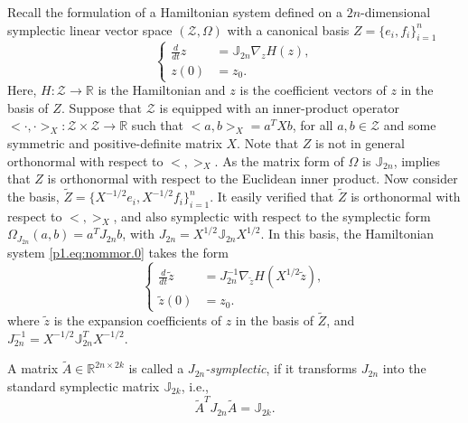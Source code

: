 Recall the formulation of a Hamiltonian system defined on a $2n$-dimensional symplectic linear vector space $(\mathcal Z,\Omega )$ with a canonical basis $Z=\{e_i,f_i\}_{i=1}^n$
\begin{equation} \label{p1.eq:nommor.0}
	\left\{
	\begin{aligned}
		\frac d {dt} z &= \mathbb J_{2n} \nabla_z H(z), \\
		z(0) &= z_0.
	\end{aligned}
	\right.
\end{equation}
Here, $H: \mathcal Z \to \mathbb R$ is the Hamiltonian and $z$ is the coefficient vectors of $z$ in the basis of $Z$. Suppose that $\mathcal Z$ is equipped with an inner-product operator $<\cdot,\cdot>_X : \mathcal Z \times \mathcal Z \to \mathbb R$ such that $<a,b>_X = a^TXb$, for all $a,b\in\mathcal Z$ and some symmetric and positive-definite matrix $X$. Note that $Z$ is not in general orthonormal with respect to $<,>_X$. As the matrix form of $\Omega$ is $\mathbb J_{2n}$,  implies that $Z$ is orthonormal with respect to the Euclidean inner product. Now consider the basis, $\tilde Z = \{ X^{-1/2}e_i,X^{-1/2}f_i \}_{i=1}^{n}$. It easily verified that $\tilde Z$ is orthonormal with respect to $<,>_{X}$, and also symplectic with respect to the symplectic form $\Omega_{J_{2n}}(a,b) = a^T J_{2n} b $, with $J_{2n} = X^{1/2} \mathbb J_{2n}X^{1/2}$. In this basis, the Hamiltonian system \eqref{p1.eq:nommor.0} takes the form
\begin{equation} \label{p1.eq:nommor.0.1}
	\left\{
	\begin{aligned}
		\frac d {dt} \tilde z &= J^{-1}_{2n} \nabla_{\tilde z} H(X^{1/2}\tilde{z}), \\
		\tilde z(0) &= z_0.
	\end{aligned}
	\right.	
\end{equation}
where $\tilde z$ is the expansion coefficients of $z$ in the basis of $\tilde Z$, and $J_{2n}^{-1} = X^{-1/2} \mathbb J_{2n}^T X^{-1/2}$. 

\begin{definition}
A matrix $\tilde A\in \mathbb R^{2n\times 2k}$ is called a \emph{$J_{2n}$-symplectic}, if it transforms $J_{2n}$ into the standard symplectic matrix $\mathbb J_{2k}$, i.e.,
\begin{equation} \label{p1.eq:nommor.0.3}
	\tilde A^T J_{2n} \tilde A = \mathbb J_{2k}.
\end{equation}
\end{definition}

